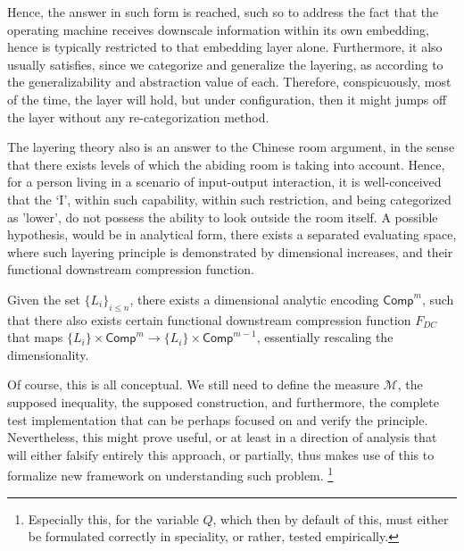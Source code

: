 Hence, the answer in such form is reached, such so to address the fact that the operating machine receives downscale information within its own embedding, hence is typically restricted to that embedding layer alone. Furthermore, it also usually satisfies, since we categorize and generalize the layering, as according to the generalizability and abstraction value of each. Therefore, conspicuously, most of the time, the layer will hold, but under configuration, then it might jumps off the layer without any re-categorization method. 

The layering theory also is an answer to the Chinese room argument, in the sense that there exists levels of which the abiding room is taking into account. Hence, for a person living in a scenario of input-output interaction, it is well-conceived that the `I', within such capability, within such restriction, and being categorized as 'lower', do not possess the ability to look outside the room itself. A possible hypothesis, would be in analytical form, there exists a separated evaluating space, where such layering principle is demonstrated by dimensional increases, and their functional downstream compression function. 

\begin{hypothesis}
    Given the set $\{L_i\}_{i\leq n}$, there exists a dimensional analytic encoding $\mathsf{Comp}^{m}$, such that there also exists certain functional downstream compression function $F_{DC}$ that maps $\{L_i\}\times \mathsf{Comp}^{m}\to\{L_i\}\times \mathsf{Comp}^{m-1}$, essentially rescaling the dimensionality. 
\end{hypothesis}

Of course, this is all conceptual. We still need to define the measure $\mathcal{M}$, the supposed inequality, the supposed construction, and furthermore, the complete test implementation that can be perhaps focused on and verify the principle. Nevertheless, this might prove useful, or at least in a direction of analysis that will either falsify entirely this approach, or partially, thus makes use of this to formalize new framework on understanding such problem. \footnote{Especially this, for the variable $Q$, which then by default of this, must either be formulated correctly in speciality, or rather, tested empirically.}